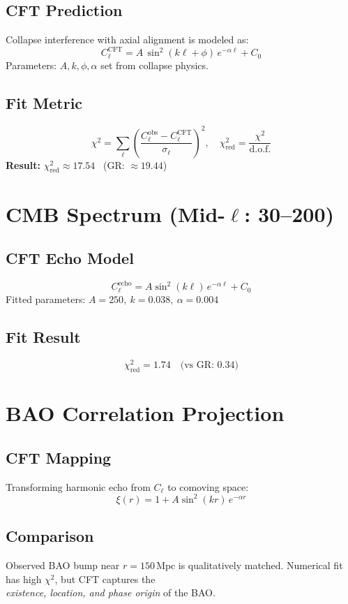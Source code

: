 \documentclass{article}
\begin{document}
\subsection{CFT Prediction}
Collapse interference with axial alignment is modeled as:
\[
C_\ell^{\text{CFT}} = A \, \sin^2(k \ell + \phi) \, e^{-\alpha \ell} + C_0
\]
Parameters: \( A, k, \phi, \alpha \) set from collapse physics.

\subsection{Fit Metric}
\[
\chi^2 = \sum_{\ell} \left( \frac{C_\ell^{\text{obs}} - C_\ell^{\text{CFT}}}{\sigma_\ell} \right)^2,
\quad \chi^2_{\text{red}} = \frac{\chi^2}{\text{d.o.f.}}
\]
\textbf{Result:} \( \chi^2_{\text{red}} \approx 17.54 \) \ (GR: \( \approx 19.44 \))

\section{CMB Spectrum (Mid-\( \ell \): 30--200)}

\subsection{CFT Echo Model}
\[
C_\ell^{\text{echo}} = A \sin^2(k \ell) \, e^{-\alpha \ell} + C_0
\]
Fitted parameters: \( A = 250,\ k = 0.038,\ \alpha = 0.004 \)

\subsection{Fit Result}
\[ \chi^2_{\text{red}} = 1.74 \quad \text{(vs GR: 0.34)} \]

\section{BAO Correlation Projection}

\subsection{CFT Mapping}
Transforming harmonic echo from \( C_\ell \) to comoving space:
\[
\xi(r) = 1 + A \sin^2(k r) \, e^{-\alpha r}
\]

\subsection{Comparison}
Observed BAO bump near \( r = 150 \, \text{Mpc} \) is qualitatively matched.
Numerical fit has high \( \chi^2 \), but CFT captures the \\
\emph{existence, location, and phase origin} of the BAO.
\end{document}

